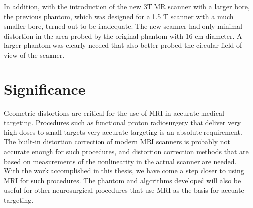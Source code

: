 In addition, with the introduction of the new 3T MR scanner with a larger bore, the previous phantom, which was designed for a 1.5 T scanner with a much smaller bore, turned out to be inadequate. The new scanner had only minimal distortion in the area probed by the original phantom with 16 cm diameter. A larger phantom was clearly needed that also better probed the circular field of view of the scanner.

\section{Significance}

Geometric distortions are critical for the use of MRI in accurate medical targeting. Procedures such as functional proton radiosurgery that deliver very high doses to small targets very accurate targeting is an absolute requirement. The built-in distortion correction of modern MRI scanners is probably not accurate enough for such procedures, and distortion correction methods that are based on measurements of the nonlinearity in the actual scanner are needed. With the work accomplished in this thesis, we have come a step closer to using MRI for such procedures. The phantom and algorithms developed will also be useful for other neurosurgical procedures that use MRI as the basis for accuate targeting.





